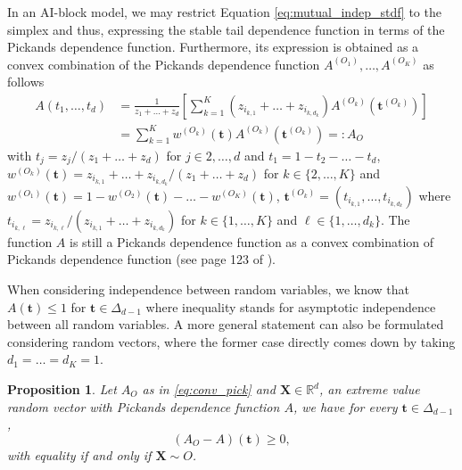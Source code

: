 \documentclass[11pt]{article}
\newtheorem{proposition}{Proposition}
\theoremstyle{definition}
\begin{document}
	In an AI-block model, we may restrict Equation \eqref{eq:mutual_indep_stdf} to the simplex and thus, expressing the stable tail dependence function in terms of the Pickands dependence function. Furthermore, its expression is obtained as a convex combination of the Pickands dependence function $A^{(O_1)}, \dots, A^{(O_K)}$ as follows 
	\begin{align}
		A(t_1, \dots, t_d) &= \frac{1}{z_1+\dots+z_d} \left[ \sum_{k=1}^K (z_{i_{k,1}} + \dots + z_{i_{k,d_k}}) A^{(O_k)}(\textbf{t}^{(O_k)}) \right] \nonumber \\ 
		&= \sum_{k=1}^K w^{(O_k)}(\textbf{t}) A^{(O_k)}(\textbf{t}^{(O_k)}) =: A_O \label{eq:conv_pick}
	\end{align}
	with $t_j = z_j / (z_1+\dots+z_d)$ for $j \in {2,\dots, d}$ and $t_1 = 1-t_2 - \dots - t_d$, $w^{(O_k)}(\textbf{t})  = z_{i_{k,1}} + \dots + z_{i_{k,d_k}} / (z_1 + \dots + z_{d})$ for $k \in \{2, \dots, K\}$ and $w^{(O_1)}(\textbf{t}) = 1-w^{(O_2)}(\textbf{t})-\dots -w^{(O_K)}(\textbf{t})$, $\textbf{t}^{(O_k)} = (t_{i_{k,1}},\dots, t_{i_{k,d_k}})$ where $t_{i_{k,\ell}} = z_{i_{k,\ell}} / (z_{i_{k,1}} + \dots + z_{i_{k,d_k}})$ for $k \in \{1, \dots, K\}$ and $\ell \in \{1, \dots, d_k\}$. The function $A$ is still a Pickands dependence function as a convex combination of Pickands dependence function (see page 123 of \cite{falk2010laws}).
	
	When considering independence between random variables, we know that $A(\textbf{t}) \leq 1$ for $\textbf{t} \in \Delta_{d-1}$ where inequality stands for asymptotic independence between all random variables. A more general statement can also be formulated considering random vectors, where the former case directly comes down by taking $d_1 = \dots = d_K = 1$.
	
	\begin{proposition}
	\label{prop:ineq}
		Let $A_O$ as in \eqref{eq:conv_pick} and $\textbf{X} \in \mathbb{R}^d$, an extreme value random vector with Pickands dependence function $A$, we have for every $\textbf{t} \in \Delta_{d-1}$, 
		\begin{equation*}
			\left(A_{O} - A\right) (\textbf{t}) \geq 0,
		\end{equation*}
		with equality if and only if $\textbf{X} \sim O$.
	\end{proposition}
	
\end{document}
